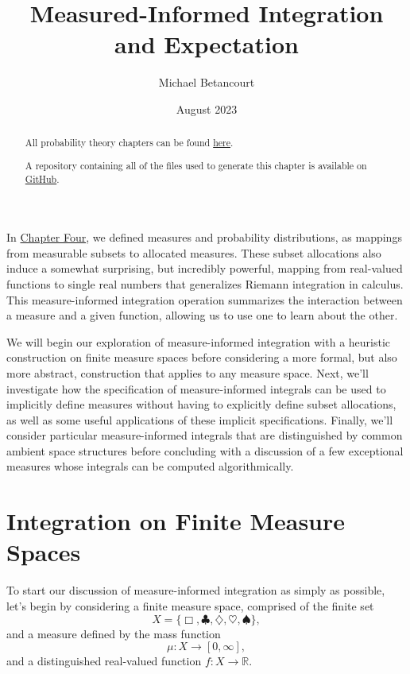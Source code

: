 \documentclass[
  letterpaper,
  DIV=11,
  numbers=noendperiod]{scrartcl}
\title{Measured-Informed Integration and Expectation}
\author{Michael Betancourt}
\date{August 2023}
\renewcommand*\contentsname{Table of contents}
\newcommand\contentsname{Table of contents}
\begin{document}
\maketitle
\begin{abstract}
All probability theory chapters can be found
\href{http://www.symplectomorphic.com/writing/\#part1}{here}.

A repository containing all of the files used to generate this chapter
is available on
\href{https://github.com/betanalpha/quarto_chapters/tree/main/5_expectation_values}{GitHub}.
\end{abstract}

\renewcommand*\contentsname{Table of contents}
{
\hypersetup{linkcolor=}
\setcounter{tocdepth}{3}
\tableofcontents
}
In
\href{http://www.symplectomorphic.com/assets/chapters_html/probability_on_general_spaces.html}{Chapter
Four}, we defined measures and probability distributions, as mappings
from measurable subsets to allocated measures. These subset allocations
also induce a somewhat surprising, but incredibly powerful, mapping from
real-valued functions to single real numbers that generalizes Riemann
integration in calculus. This measure-informed integration operation
summarizes the interaction between a measure and a given function,
allowing us to use one to learn about the other.

We will begin our exploration of measure-informed integration with a
heuristic construction on finite measure spaces before considering a
more formal, but also more abstract, construction that applies to any
measure space. Next, we'll investigate how the specification of
measure-informed integrals can be used to implicitly define measures
without having to explicitly define subset allocations, as well as some
useful applications of these implicit specifications. Finally, we'll
consider particular measure-informed integrals that are distinguished by
common ambient space structures before concluding with a discussion of a
few exceptional measures whose integrals can be computed
algorithmically.

\section{Integration on Finite Measure
Spaces}\label{sec:finite_integration}

To start our discussion of measure-informed integration as simply as
possible, let's begin by considering a finite measure space, comprised
of the finite set \[
X = \{ \Box, \clubsuit, \diamondsuit, \heartsuit, \spadesuit \},
\] and a measure defined by the mass function \[
\mu : X \rightarrow [0, \infty],
\] and a distinguished real-valued function
\(f : X \rightarrow \mathbb{R}\).
\end{document}

